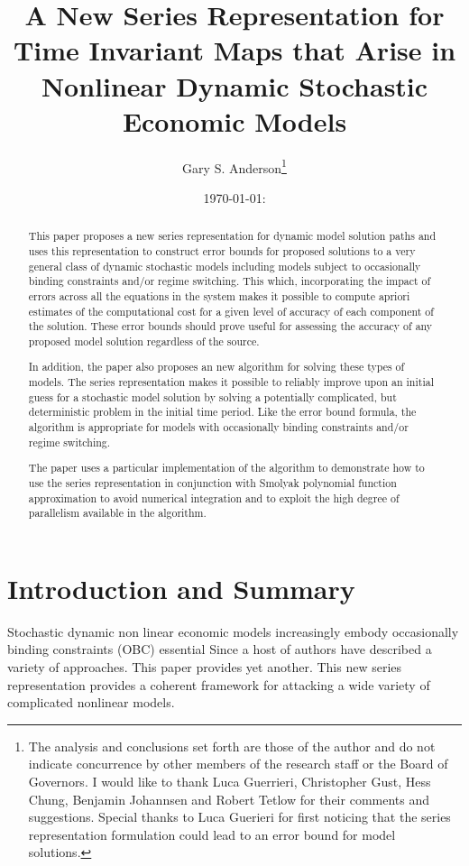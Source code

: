 \documentclass[12pt]{article}
\author{Gary S. Anderson\thanks{The analysis and conclusions set forth are those of the author and do not indicate concurrence by other members of the research staff or the Board of Governors. I would like to thank Luca Guerrieri, Christopher Gust, Hess Chung, Benjamin Johannsen  and Robert Tetlow for their comments and suggestions.  Special thanks to Luca Guerieri for first noticing that the series representation formulation could lead to an error bound for model solutions.}}
\title{A New Series Representation for Time Invariant Maps that
 Arise in  Nonlinear Dynamic Stochastic Economic Models}
\date{\today: \currenttime}
\begin{document}
\maketitle

\begin{abstract}
This paper proposes a new series representation for dynamic model solution paths and uses this representation to construct error bounds for proposed solutions to a very general class of dynamic stochastic models including models subject to occasionally binding constraints and/or regime switching.
This which, incorporating the impact of errors across  all the equations in 
the system makes it possible to compute
apriori estimates of the computational cost for a
given level of accuracy of each component of the solution.
These error bounds should prove useful for assessing the accuracy of any
proposed model solution regardless of the source.


In addition, the paper also proposes an new algorithm for solving these types of models.
The series representation makes it possible to reliably improve upon an initial
guess for a stochastic model solution by solving a 
potentially complicated, but deterministic problem in the initial time period.
Like the error bound formula, the algorithm is appropriate for models with occasionally binding constraints and/or regime switching. 


The  paper uses a particular implementation of the algorithm to
demonstrate how to use the 
series representation in conjunction with 
Smolyak polynomial function approximation to avoid numerical integration
and to exploit the high degree of parallelism available in the algorithm.







\end{abstract}

\newpage
\tableofcontents
\newpage

\section{Introduction and Summary}





Stochastic dynamic non linear economic
models increasingly embody  occasionally binding constraints (OBC) essential
Since \cite{Christiano2000} a host of
authors have described a variety of approaches. 
\cite{holden15:_exist_dsge,guerrieri15:_occbin,benigno09,hintermaier10,brumm10,nakov08,haefke98,nakata12,gordon11,billi11,Hintermaier2010,Guerrieri2015}
This paper provides yet another.  This new series representation provides  a coherent framework for attacking a wide variety of complicated nonlinear models.
\end{document}
